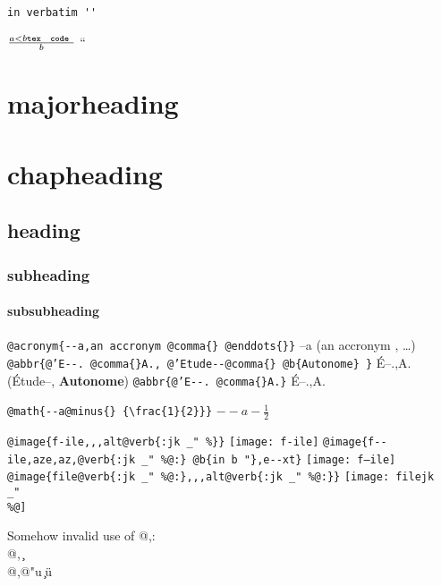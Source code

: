 \documentclass{book}
\newcommand{\GNUTexinfoplaceholder}[1]{}
\newcommand{\GNUTexinfonopagebreakheading}[2]{\let\clearpage\relax \let\cleardoublepage\relax \let\thispagestyle\GNUTexinfoplaceholder #1{#2}}
\renewcommand{\includegraphics}[1]{\fbox{FIG #1}}
\begin{document}
\begin{verbatim}
in verbatim ''
\end{verbatim}





$\frac{a < b \texttt{tex \hbox{ code }}}{b}$ ``

\GNUTexinfonopagebreakheading{\chapter*}{majorheading}

\GNUTexinfonopagebreakheading{\chapter*}{chapheading}

\GNUTexinfonopagebreakheading{\section*}{heading}

\GNUTexinfonopagebreakheading{\subsection*}{subheading}

\GNUTexinfonopagebreakheading{\subsubsection*}{subsubheading}


\texttt{@acronym\{{-}{-}a,an accronym @comma\{\} @enddots\{\}\}} --a (an accronym , \dots{})
\texttt{@abbr\{@'E{-}{-}. @comma\{\}A., @'Etude{-}{-}@comma\{\} @b\{Autonome\} \}} \'{E}--.\@ ,A.\@ (\'{E}tude--, \textbf{Autonome})
\texttt{@abbr\{@'E{-}{-}. @comma\{\}A.\}} \'{E}--.\@ ,A.\@

\texttt{@math\{{-}{-}a@minus\{\} \{\textbackslash{}frac\{1\}\{2\}\}\}} $--a- {\frac{1}{2}}$

\texttt{@image\{f-ile,,,alt@verb\{:jk \_" \%\@\}\}} \texttt{[image: f-ile]}
\texttt{@image\{f{-}{-}ile,aze,az,@verb\{:jk \_" \%@:\} @b\{in b "\},e{-}{-}xt\}} \texttt{[image: f--ile]}
\texttt{@image\{file@verb\{:jk \_" \%@:\},,,alt@verb\{:jk \_" \%@:\}\}} \texttt{[image: filejk \\\_" \\\%@]}




Somehow invalid use of @,:\leavevmode{}\\
@, \c{}
\leavevmode{}\\
@,@"u \c{}\"{u}
\end{document}

